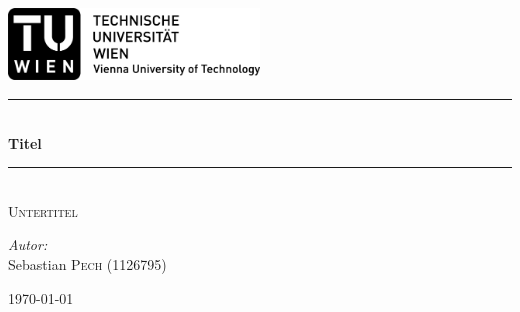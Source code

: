 \begin{titlepage}
\includegraphics[width=0.5\textwidth]{Abbildungen/logo.png}\\[1cm]    
\begin{center}



\newcommand{\HRule}{\rule{\linewidth}{0.5mm}}
\HRule \\[0.4cm]
{ \huge \bfseries Titel}\\
\HRule \\[0.4cm]
\textsc{\Large Untertitel}\\[8.0cm]
\begin{minipage}{0.4\textwidth}
\begin{flushleft} \large
\emph{Autor:}\\
Sebastian \textsc{Pech} (1126795)
\end{flushleft}
\end{minipage}
\hfill
\begin{minipage}{0.4\textwidth}
\begin{flushright} \large

\end{flushright}
\end{minipage}

\vfill

{\large \today}

\end{center}

\end{titlepage}

